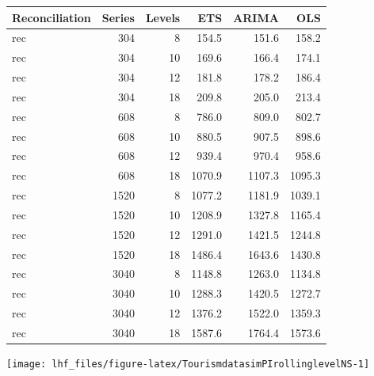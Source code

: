 \documentclass[11pt,a4paper,]{article}
\let\origfigure\figure
\let\endorigfigure\endfigure
\renewenvironment{figure}[1][2] {
    \expandafter\origfigure\expandafter[!htbp]
} {
    \endorigfigure
}
\let\origtable\table
\let\endorigtable\endtable
\renewenvironment{table}[1][2] {
    \expandafter\origtable\expandafter[!htbp]
} {
    \endorigtable
}
\begin{document}
\begin{table}[!h]

\caption{\label{tab:TourismdatasimfixlevelNS}Mean RMSE by number of hierarchy levels, number of bottom-level series, method, with reconciliation. Simulated series has error value 0.5. Forecasting uses fixed origin for a 24-month horizon.}
\centering
\begin{tabular}[t]{lrrrrr}
\toprule
Reconciliation & Series & Levels & ETS & ARIMA & OLS\\
\midrule
rec & 304 & 8 & 154.5 & 151.6 & 158.2\\
rec & 304 & 10 & 169.6 & 166.4 & 174.1\\
rec & 304 & 12 & 181.8 & 178.2 & 186.4\\
rec & 304 & 18 & 209.8 & 205.0 & 213.4\\
rec & 608 & 8 & 786.0 & 809.0 & 802.7\\
rec & 608 & 10 & 880.5 & 907.5 & 898.6\\
rec & 608 & 12 & 939.4 & 970.4 & 958.6\\
rec & 608 & 18 & 1070.9 & 1107.3 & 1095.3\\
rec & 1520 & 8 & 1077.2 & 1181.9 & 1039.1\\
rec & 1520 & 10 & 1208.9 & 1327.8 & 1165.4\\
rec & 1520 & 12 & 1291.0 & 1421.5 & 1244.8\\
rec & 1520 & 18 & 1486.4 & 1643.6 & 1430.8\\
rec & 3040 & 8 & 1148.8 & 1263.0 & 1134.8\\
rec & 3040 & 10 & 1288.3 & 1420.5 & 1272.7\\
rec & 3040 & 12 & 1376.2 & 1522.0 & 1359.3\\
rec & 3040 & 18 & 1587.6 & 1764.4 & 1573.6\\
\bottomrule
\end{tabular}
\end{table}

\begin{figure}

{\centering \texttt{[image: lhf\_files/figure-latex/TourismdatasimPIrollinglevelNS-1]} 

}

\caption{Comparing reconciled rolling origin forecasts and prediction intervals for a sample bottom-level series, for different number of bottom-level series and hierarchy levels (different panels). Simulated series has error value 0.5 and 24 months test set.}\label{fig:TourismdatasimPIrollinglevelNS}
\end{figure}
\end{document}
